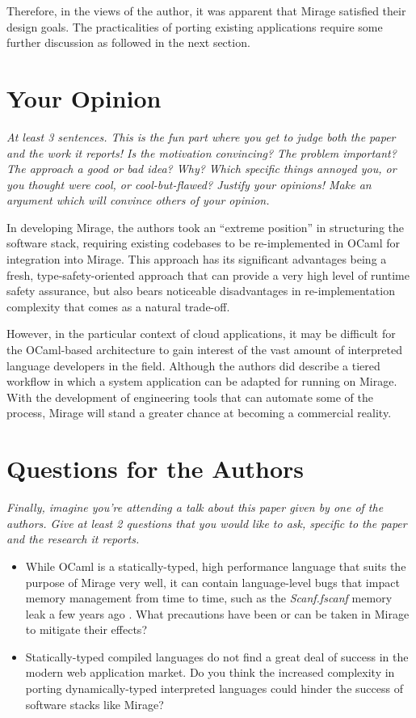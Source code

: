 \documentclass[11pt]{article}
\begin{document}
Therefore, in the views of the author, it was apparent that Mirage satisfied their design goals. The practicalities of porting existing applications require some further discussion as followed in the next section. 

\section*{Your Opinion}
\textsl{At least 3 sentences. This is the fun part where you get to judge both the paper and the work it reports! Is the motivation convincing? The problem important? The approach a good or bad idea?  Why? Which specific things annoyed you, or you thought were cool, or cool-but-flawed? Justify your opinions! Make an argument which will convince others of your opinion.}

In developing Mirage, the authors took an ``extreme position'' in structuring the software stack, requiring existing codebases to be re-implemented in OCaml for integration into Mirage. This approach has its significant advantages being a fresh, type-safety-oriented approach that can provide a very high level of runtime safety assurance, but also bears noticeable disadvantages in re-implementation complexity that comes as a natural trade-off. 

However, in the particular context of cloud applications, it may be difficult for the OCaml-based architecture to gain interest of the vast amount of interpreted language developers in the field. Although the authors did describe a tiered workflow in which a system application can be adapted for running on Mirage. With the development of engineering tools that can automate some of the process, Mirage will stand a greater chance at becoming a commercial reality.

\section*{Questions for the Authors}
\textsl{Finally, imagine you're attending a talk about this paper given by one of the authors. Give at least 2 questions that you would like to ask, specific to the paper and the research it reports.}


\begin{itemize}
	\item While OCaml is a statically-typed, high performance language that suits the purpose of Mirage very well, it can contain language-level bugs that impact memory management from time to time, such as the \emph{Scanf.fscanf} memory leak a few years ago \cite{ocamlmemoryleak}. What precautions have been or can be taken in Mirage to mitigate their effects?
	\item Statically-typed compiled languages do not find a great deal of success in the modern web application market. Do you think the increased complexity in porting dynamically-typed interpreted languages could hinder the success of software stacks like Mirage?
\end{itemize}


\footnotesize{}
\end{document}
